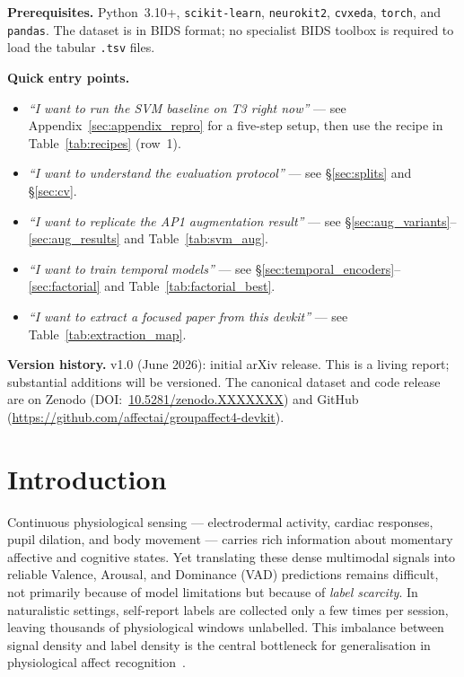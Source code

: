 \documentclass[sigconf,nonacm]{acmart}
\begin{document}
\smallskip\noindent\textbf{Prerequisites.}
Python~3.10+, \texttt{scikit-learn}, \texttt{neurokit2}, \texttt{cvxeda},
\texttt{torch}, and \texttt{pandas}.
The dataset is in BIDS format; no specialist BIDS toolbox is required to load the
tabular \texttt{.tsv} files.

\smallskip\noindent\textbf{Quick entry points.}
\begin{itemize}[leftmargin=1.2em,topsep=2pt,itemsep=1pt]
  \item \emph{``I want to run the SVM baseline on T3 right now''} ---
        see Appendix~\ref{sec:appendix_repro} for a five-step setup, then
        use the recipe in Table~\ref{tab:recipes} (row~1).
  \item \emph{``I want to understand the evaluation protocol''} ---
        see \S\ref{sec:splits} and \S\ref{sec:cv}.
  \item \emph{``I want to replicate the AP1 augmentation result''} ---
        see \S\ref{sec:aug_variants}--\ref{sec:aug_results} and
        Table~\ref{tab:svm_aug}.
  \item \emph{``I want to train temporal models''} ---
        see \S\ref{sec:temporal_encoders}--\ref{sec:factorial} and
        Table~\ref{tab:factorial_best}.
  \item \emph{``I want to extract a focused paper from this devkit''} ---
        see Table~\ref{tab:extraction_map}.
\end{itemize}

\smallskip\noindent\textbf{Version history.}
v1.0 (June 2026): initial arXiv release.
This is a living report; substantial additions will be versioned.
The canonical dataset and code release are on Zenodo (DOI:~\url{10.5281/zenodo.XXXXXXX})
and GitHub (\url{https://github.com/affectai/groupaffect4-devkit}).

\section{Introduction}
\label{sec:intro}

Continuous physiological sensing --- electrodermal activity, cardiac
responses, pupil dilation, and body movement --- carries rich information
about momentary affective and cognitive states.
Yet translating these dense multimodal signals into reliable Valence,
Arousal, and Dominance (VAD) predictions remains difficult,
not primarily because of model limitations but because of
\emph{label scarcity}.
In naturalistic settings, self-report labels are collected only a few times
per session, leaving thousands of physiological windows unlabelled.
This imbalance between signal density and label density is the central
bottleneck for generalisation in physiological affect
recognition~\cite{shu2018review,ahmad2022survey}.
\end{document}
